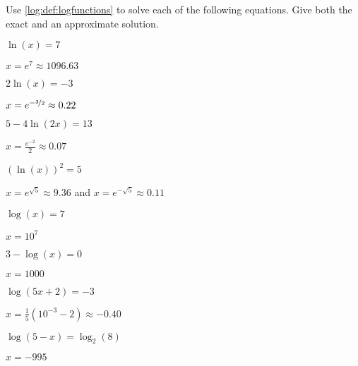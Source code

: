 \begin{exercises}
\begin{problem}
Use \cref{log:def:logfunctions} to solve each of the following equations. Give both 
the exact and an approximate solution.
\begin{multicols}{4}
	\begin{subproblem}
		$\ln(x)=7$ 
		\begin{shortsolution}
			$x=e^7\approx 1096.63$
		\end{shortsolution}
	\end{subproblem}
	\begin{subproblem}
		$2\ln(x)=-3$ 
		\begin{shortsolution}
			$x=e^{-\nicefrac{3}{2}}\approx 0.22$
		\end{shortsolution}
	\end{subproblem}
	\begin{subproblem}
		$5-4\ln(2x)=13$ 
		\begin{shortsolution}
			$x=\frac{e^{-2}}{2}\approx 0.07$
		\end{shortsolution}
	\end{subproblem}
	\begin{subproblem}
		$(\ln(x))^2=5$ 
		\begin{shortsolution}
			$x=e^{\sqrt{5}}\approx 9.36$ and $x=e^{-\sqrt{5}}\approx 0.11$
		\end{shortsolution}
	\end{subproblem}
	\begin{subproblem}
		$\log(x)=7$ 
		\begin{shortsolution}
			$x=10^7$
		\end{shortsolution}
	\end{subproblem}
	\begin{subproblem}
		$3-\log(x)=0$ 
		\begin{shortsolution}
			$x=1000$
		\end{shortsolution}
	\end{subproblem}
	\begin{subproblem}
		$\log(5x+2)=-3$ 
		\begin{shortsolution}
			$x=\frac{1}{5}\left( 10^{-3}-2 \right)\approx -0.40$
		\end{shortsolution}
	\end{subproblem}
	\begin{subproblem}
		$\log(5-x)=\log_2(8)$ 
		\begin{shortsolution}
			$x=-995$
		\end{shortsolution}
	\end{subproblem}
\end{multicols}
\end{problem}



\end{exercises}
